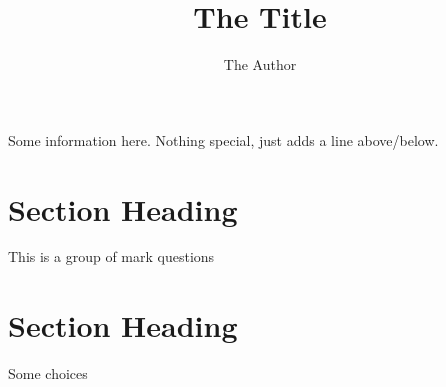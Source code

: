 \documentclass[draft,english,pdf,pagemark,stamp]{sdaps}
\author{The Author}
\title{The Title}
\begin{document}
  \begin{questionnaire}
    \begin{info}
      Some information here. Nothing special, just adds a line above/below.
    \end{info}

    \section{Section Heading}

    \begin{markgroup}{This is a group of mark questions}
    \end{markgroup}


    \section{Section Heading}

    \begin{choicequestion}[4]{Some choices}
    \end{choicequestion}


  \end{questionnaire}
\end{document}
